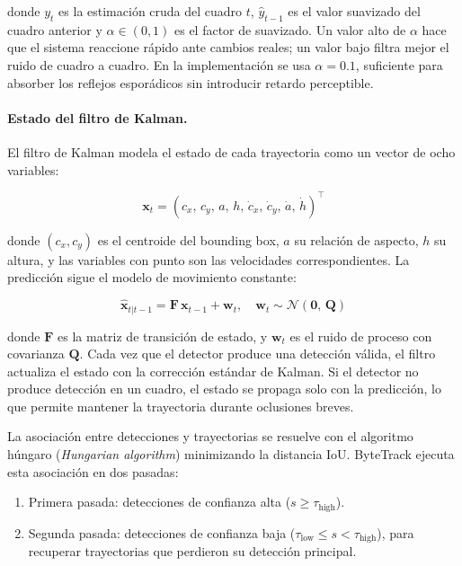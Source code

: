 donde $y_t$ es la estimación cruda del cuadro $t$, $\hat{y}_{t-1}$ es el
valor suavizado del cuadro anterior y $\alpha \in (0,1)$ es el factor de
suavizado. Un valor alto de $\alpha$ hace que el sistema reaccione rápido
ante cambios reales; un valor bajo filtra mejor el ruido de cuadro a cuadro.
En la implementación se usa $\alpha = 0.1$, suficiente para absorber los
reflejos esporádicos sin introducir retardo perceptible.

\paragraph{Estado del filtro de Kalman.}
El filtro de Kalman modela el estado de cada trayectoria como un vector de
ocho variables:

\begin{equation}
    \mathbf{x}_t = (c_x,\, c_y,\, a,\, h,\, \dot{c}_x,\, \dot{c}_y,\,
                    \dot{a},\, \dot{h})^{\top}
    \label{eq:kalman_state}
\end{equation}

donde $(c_x, c_y)$ es el centroide del bounding box, $a$ su relación de
aspecto, $h$ su altura, y las variables con punto son las velocidades
correspondientes. La predicción sigue el modelo de movimiento constante:

\begin{equation}
    \hat{\mathbf{x}}_{t|t-1} = \mathbf{F}\,\mathbf{x}_{t-1} + \mathbf{w}_t,
    \quad \mathbf{w}_t \sim \mathcal{N}(\mathbf{0},\,\mathbf{Q})
    \label{eq:kalman_pred}
\end{equation}

donde $\mathbf{F}$ es la matriz de transición de estado, y $\mathbf{w}_t$
es el ruido de proceso con covarianza $\mathbf{Q}$. Cada vez que el detector
produce una detección válida, el filtro actualiza el estado con la corrección
estándar de Kalman. Si el detector no produce detección en un cuadro, el
estado se propaga solo con la predicción, lo que permite mantener la
trayectoria durante oclusiones breves.

La asociación entre detecciones y trayectorias se resuelve con el algoritmo
húngaro (\textit{Hungarian algorithm}) minimizando la distancia IoU.
ByteTrack ejecuta esta asociación en dos pasadas:

\begin{enumerate}
    \item Primera pasada: detecciones de confianza alta
          ($s \geq \tau_\text{high}$).
    \item Segunda pasada: detecciones de confianza baja
          ($\tau_\text{low} \leq s < \tau_\text{high}$), para recuperar
          trayectorias que perdieron su detección principal.
\end{enumerate}

